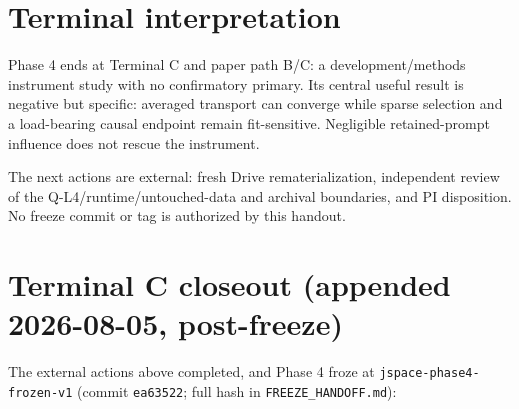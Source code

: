 \documentclass[10pt]{article}
\begin{document}
\section{Terminal interpretation}

\enlargethispage{1.5\baselineskip}

Phase 4 ends at Terminal C and paper path B/C: a development/methods instrument
study with no confirmatory primary. Its central useful result is negative but
specific: averaged transport can converge while sparse selection and a
load-bearing causal endpoint remain fit-sensitive. Negligible retained-prompt
influence does not rescue the instrument.

The next actions are external: fresh Drive rematerialization, independent
review of the Q-L4/runtime/untouched-data and archival boundaries, and PI
disposition. No freeze commit or tag is authorized by this handout.

\section{Terminal C closeout (appended 2026-08-05, post-freeze)}

The external actions above completed, and Phase 4 froze at
\texttt{jspace-phase4-frozen-v1} (commit \texttt{ea63522}; full hash in
\texttt{FREEZE\_HANDOFF.md}):
\end{document}
